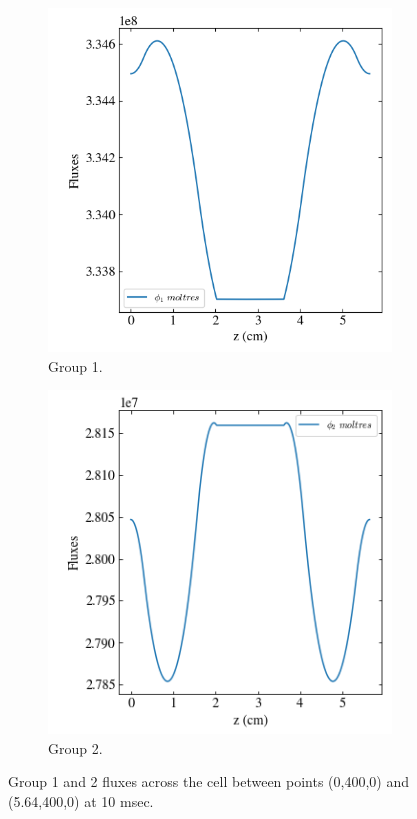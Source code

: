 \documentclass[11pt,letterpaper]{article}
\begin{document}
	\begin{figure}[htbp!]
		\centering
		\begin{subfigure}[t]{0.4\textwidth}
			\centering
			\includegraphics[width=\linewidth]{2D-unitcell-reflecB-action3}
			\caption{Group 1.}
		\end{subfigure}
		\begin{subfigure}[t]{0.4\textwidth}
			\centering
			\includegraphics[width=\linewidth]{2D-unitcell-reflecB-action4}
			\caption{Group 2.}
		\end{subfigure}
		\hfill
		\caption{Group 1 and 2 fluxes across the cell between points (0,400,0) and (5.64,400,0) at 10 msec.}
		\label{fig:2D-unitcell-reflecB2}
	\end{figure}
\end{document}

